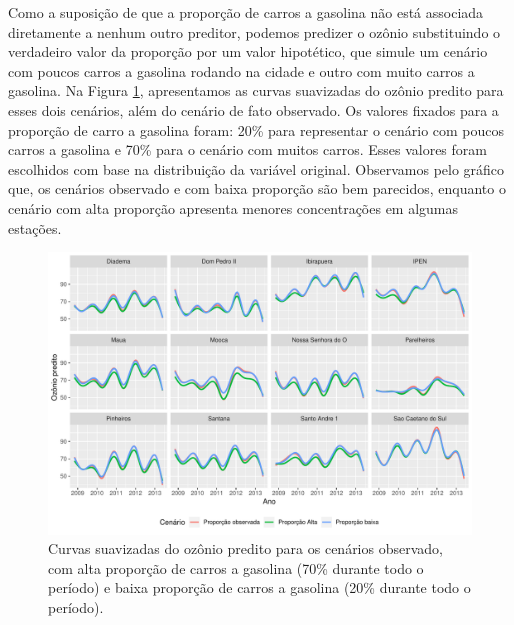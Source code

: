 Como a suposição de que a proporção de carros a gasolina não está associada diretamente a nenhum outro preditor, podemos predizer o ozônio substituindo o verdadeiro valor da proporção por um valor hipotético, que simule um cenário com poucos carros a gasolina rodando na cidade e outro com muito carros a gasolina. Na Figura \ref{fig:cap-comb-random-forest-cenarios}, apresentamos as curvas suavizadas do ozônio predito para esses dois cenários, além do cenário de fato observado. Os valores fixados para a proporção de carro a gasolina foram: 20\% para representar o cenário com poucos carros a gasolina e 70\% para o cenário com muitos carros. Esses valores foram escolhidos com base na distribuição da variável original. Observamos pelo gráfico que, os cenários observado e com baixa proporção são bem parecidos, enquanto o cenário com alta proporção apresenta menores concentrações em algumas estações.

\begin{figure}[h!]
	\centering
	\includegraphics[width=0.7\linewidth]{figuras/cap-comb-random-forest-cenarios.pdf}
	\caption{Curvas suavizadas do ozônio predito para os cenários observado, com alta proporção de carros a gasolina (70\% durante todo o período) e baixa proporção de carros a gasolina (20\% durante todo o período).}
	\label{fig:cap-comb-random-forest-cenarios}
\end{figure}